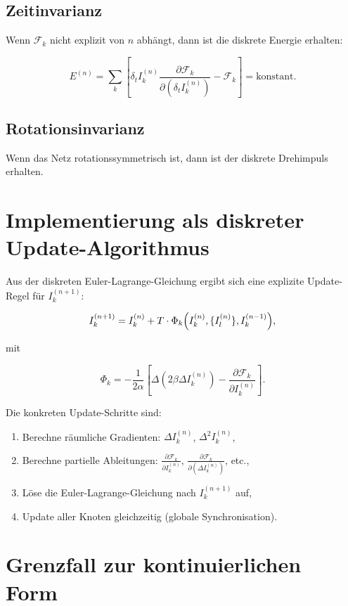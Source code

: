 \subsection{Zeitinvarianz}
\label{sub:zeitinvarianz}

Wenn \( \mathcal{F}_k \) nicht explizit von \( n \) abhängt, dann ist die diskrete Energie erhalten:

\[
E^{(n)} = \sum_k \left[ \delta_t I_k^{(n)} \frac{\partial \mathcal{F}_k}{\partial (\delta_t I_k^{(n)})} - \mathcal{F}_k \right] = \text{konstant}.
\]

\subsection{Rotationsinvarianz}
\label{sub:rotationsinvarianz}

Wenn das Netz rotationssymmetrisch ist, dann ist der diskrete Drehimpuls erhalten.

\section{Implementierung als diskreter Update-Algorithmus}
\label{sec:update_algorithmus}

Aus der diskreten Euler-Lagrange-Gleichung ergibt sich eine explizite Update-Regel für \( I_k^{(n+1)} \):

\[
I_k^{(n+1)} = I_k^{(n)} + T \cdot \Phi_k \Bigl( I_k^{(n)}, \{I_l^{(n)}\}, I_k^{(n-1)} \Bigr),
\]

mit

\[
\Phi_k = -\frac{1}{2\alpha} \left[ \Delta \left( 2\beta \Delta I_k^{(n)} \right) - \frac{\partial \mathcal{F}_k}{\partial I_k^{(n)}} \right].
\]

Die konkreten Update-Schritte sind:

\begin{enumerate}
    \item Berechne räumliche Gradienten: \( \Delta I_k^{(n)} \), \( \Delta^2 I_k^{(n)} \),
    \item Berechne partielle Ableitungen: \( \frac{\partial \mathcal{F}_k}{\partial I_k^{(n)}} \), \( \frac{\partial \mathcal{F}_k}{\partial (\Delta I_k^{(n)})} \), etc.,
    \item Löse die Euler-Lagrange-Gleichung nach \( I_k^{(n+1)} \) auf,
    \item Update aller Knoten gleichzeitig (globale Synchronisation).
\end{enumerate}

\section{Grenzfall zur kontinuierlichen Form}
\label{sec:kontinuierlicher_grenzfall_lagrange}

